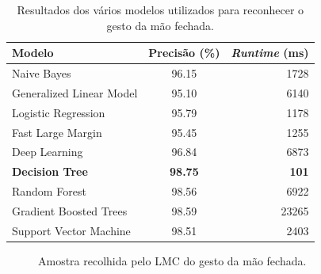 \documentclass{TTUPhD}
\begin{document}
\begin{table}[h!]
    \center
    \begin{tabular}{|l|c|r|}
        \hline
        \textbf{Modelo} & \textbf{Precisão (\%)} & \textbf{\textit{Runtime} (ms)}\\
        \hline
        \hline
        Naive Bayes & 96.15 & 1728\\
        Generalized Linear Model & 95.10 & 6140\\
        Logistic Regression & 95.79 & 1178\\
        Fast Large Margin & 95.45 & 1255\\
        Deep Learning & 96.84 & 6873\\
        \textbf{Decision Tree} & \textbf{98.75} & \textbf{101}\\
        Random Forest & 98.56 & 6922\\
        Gradient Boosted Trees & 98.59 & 23265\\
        Support Vector Machine & 98.51 & 2403\\
        \hline
    \end{tabular}
    \caption{Resultados dos vários modelos utilizados para reconhecer o gesto da mão fechada.}
\end{table}

\vspace{-0.45cm}

\begin{figure}[h!]
    \center
    \caption{Amostra recolhida pelo LMC do gesto da mão fechada.}
    \label{fig:closed_hand}
\end{figure}
\end{document}
